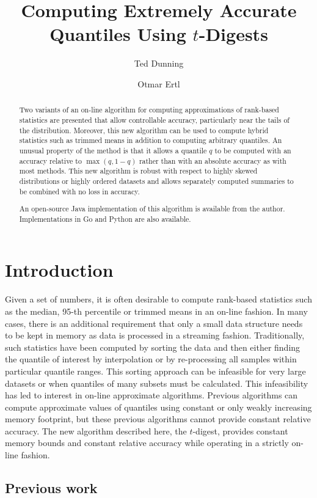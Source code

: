 \documentclass[11pt]{amsart}
\title{Computing Extremely Accurate Quantiles Using $t$-Digests}
\author{Ted Dunning}
\author{Otmar Ertl}
\date{}                                           %
\begin{document}
\begin{abstract}
Two variants of an on-line algorithm for computing approximations of rank-based statistics are presented that allow controllable accuracy, particularly near the tails of the distribution.  Moreover, this new algorithm can be used to compute hybrid statistics such as trimmed means in addition to computing arbitrary quantiles.  An unusual property of the method is that it allows a quantile $q$ to be computed with an accuracy relative to $\max(q, 1-q)$ rather than with an absolute accuracy as with most methods.  This new algorithm is robust with respect to highly skewed distributions or highly ordered datasets and allows separately computed summaries to be combined with no loss in accuracy.

An open-source Java implementation of this algorithm is available from the author. Implementations in Go and Python are also available.
\end{abstract}
\maketitle
\section{Introduction}
Given a set of numbers, it is often desirable to compute rank-based statistics such as the median, 95-th percentile or trimmed means in an on-line fashion. In many cases, there is an additional requirement that only a small data structure needs to be kept in memory as data is processed in a streaming fashion.  Traditionally, such statistics have been computed by sorting the data and then either finding the quantile of interest by interpolation or by re-processing all samples within particular quantile ranges.  This sorting approach can be infeasible for very large datasets or when quantiles of many subsets must be calculated. This infeasibility has led to interest in on-line approximate algorithms. Previous algorithms can compute approximate values of quantiles using constant or only weakly increasing memory footprint, but these previous algorithms cannot provide constant relative accuracy.  The new algorithm described here, the $t$-digest, provides constant memory bounds and constant relative accuracy while operating in a strictly on-line fashion.

\subsection{Previous work}
\end{document}
